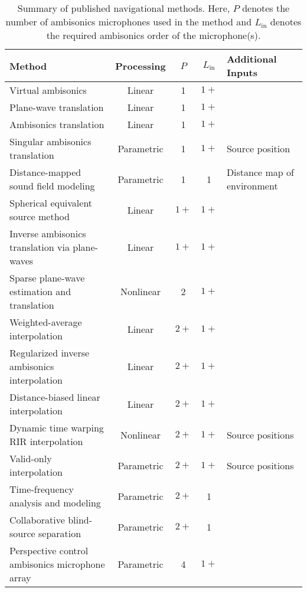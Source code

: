 \begin{sidewaystable}
\centering
\begin{tabular}{l|c|c|c|l}
\textbf{Method} & \textbf{Processing} & $P$ & $L_\textrm{in}$ & \textbf{Additional Inputs} \\\hline\hline
Virtual ambisonics \citep[section 3.1]{TylkaChoueiri2015} & Linear & 1 & $1+$ & \\\hline
Plane-wave translation \citep{SchultzSpors2013} & Linear & 1 & $1+$ & \\\hline
Ambisonics translation \citep{GumerovDuraiswami2005,MenziesAlAkaidi2007a,Zotter2009PhD} & Linear & 1 & $1+$ & \\\hline
Singular ambisonics translation \citep{Wakayama2017} & Parametric & 1 & $1+$ & Source position \\\hline
Distance-mapped sound field modeling \citep{Plinge2018} & Parametric & 1 & 1 & Distance map of environment \\\hline
Spherical equivalent source method \citep{FernandezGrande2016} & Linear & $1+$ & $1+$ &  \\\hline
Inverse ambisonics translation via plane-waves \citep{WangChen2018} & Linear & $1+$ & $1+$ &  \\\hline
Sparse plane-wave estimation and translation \citep{Emura2017} & Nonlinear & 2 & $1+$ &  \\\hline
Weighted-average interpolation \citep{Southern2009,MarietteKatz2009} & Linear & $2+$ & $1+$ &  \\\hline
Regularized inverse ambisonics interpolation \citep{Samarasinghe2014a,TylkaChoueiri2016,Ueno2018} & Linear & $2+$ & $1+$ &  \\\hline
Distance-biased linear interpolation \citep{Patricio2019} & Linear & $2+$ & $1+$ &  \\\hline
Dynamic time warping RIR interpolation \citep{Masterson2009,Kearney2009} & Nonlinear & $2+$ & $1+$ & Source positions \\\hline
Valid-only interpolation \citep{TylkaChoueiri2016} & Parametric & $2+$ & $1+$ & Source positions \\\hline
Time-frequency analysis and modeling \citep{Thiergart2013} & Parametric & $2+$ & 1 &  \\\hline
Collaborative blind-source separation \citep{Zheng2013PhD} & Parametric & $2+$ & 1 &  \\\hline
Perspective control ambisonics microphone array \citep{Bates2018} & Parametric & 4 & $1+$ & 
\end{tabular}
\caption[Summary of published navigational methods.]{
Summary of published navigational methods.
Here, $P$ denotes the number of ambisonics microphones used in the method and $L_\text{in}$ denotes the required ambisonics order of the microphone(s).}
\label{tab:01_Introduction:Methods}
\end{sidewaystable}